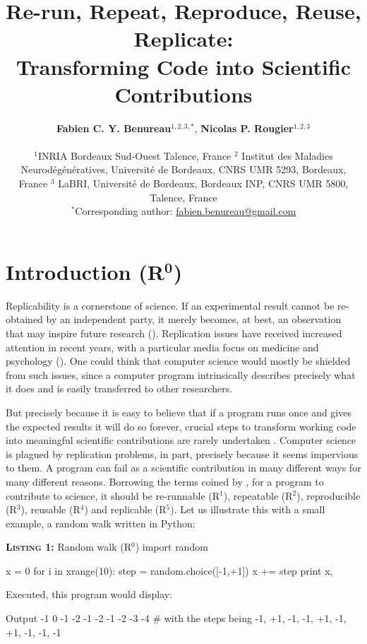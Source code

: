 \documentclass[a4paper,11pt]{article}
\title{Re-run, Repeat, Reproduce, Reuse, Replicate:\\Transforming Code into Scientific Contributions}
\author{
  \textbf{Fabien C. Y. Benureau}$^{1,2,3,*}$,
  \textbf{Nicolas P. Rougier}$^{1,2,3}$\\ \begin{minipage}{\textwidth}
    \begin{center}
      \vspace{2mm}
      $^{1}$INRIA Bordeaux Sud-Ouest Talence, France $^{2}$ Institut des
      Maladies Neurodégénératives, Université de Bordeaux, CNRS UMR 5293,
      Bordeaux, France $^{3}$ LaBRI, Université de Bordeaux, Bordeaux INP, CNRS
      UMR 5800, Talence, France\\
      \vspace{2mm}
      $^{*}$Corresponding author:
      \href{mailto:fabien.benureau@gmail.com}{fabien.benureau@gmail.com}
    \end{center}
  \end{minipage}
}
\date{}
\begin{document}
\maketitle
\section*{Introduction (R$^{\mathbf 0}$)}

Replicability is a cornerstone of science.  If an experimental result cannot be
re-obtained by an independent party, it merely becomes, at best, an observation
that may inspire future research (\cite{Mesirov:2010,osc:2015}). Replication
issues have received increased attention in recent years, with a particular
media focus on medicine and psychology (\cite{Iqbal:2016}).  One could think
that computer science would mostly be shielded from such issues, since a
computer program intrinsically describes precisely what it does and is easily
transferred to other researchers.

But precisely because it is easy to believe that if a program runs once and
gives the expected results it will do so forever, crucial steps to transform
working code into meaningful scientific contributions are rarely undertaken
\citep{Sandve:2013,Schwab:2000}. Computer science is plagued by replication
problems, in part, precisely because it seems impervious to them. A program can
fail as a scientific contribution in many different ways for many different
reasons. Borrowing the terms coined by \citeauthor{Goble:2016}
\citep{Goble:2016}, for a program to contribute to science, it should be
re-runnable (R$^1$), repeatable (R$^2$), reproducible (R$^3$),
reusable (R$^4$) and replicable (R$^5$). Let us illustrate this with a small
example, a random walk written in Python:\\

\noindent \begin{minipage}[c]{\linewidth}
\begin{code}{\textbf{\textsc{Listing 1:}} Random walk (R$^0$)}
import random

x = 0
for i in xrange(10):
    step = random.choice([-1,+1])
    x += step
    print x,
\end{code}
\end{minipage}

Executed, this program would display:
\begin{code}{Output}
-1 0 -1 -2 -1 -2 -1 -2 -3 -4 # with the steps being -1, +1, -1, -1, +1, -1, +1, -1, -1,  -1
\end{code}
\end{document}
